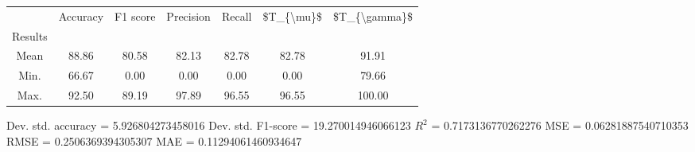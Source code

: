 \begin{tabular}{|c|c|c|c|c|c|c|}
\toprule
{} &  Accuracy &  F1 score &  Precision &  Recall &  \$T\_\{\textbackslash mu\}\$ &  \$T\_\{\textbackslash gamma\}\$ \\
Results &           &           &            &         &            &               \\
\hline
Mean    &     88.86 &     80.58 &      82.13 &   82.78 &      82.78 &         91.91 \\
Min.    &     66.67 &      0.00 &       0.00 &    0.00 &       0.00 &         79.66 \\
Max.    &     92.50 &     89.19 &      97.89 &   96.55 &      96.55 &        100.00 \\
\bottomrule
\end{tabular}

 Dev. std. accuracy = 5.926804273458016
 Dev. std. F1-score = 19.270014946066123
 $R^2$ = 0.7173136770262276
 MSE = 0.06281887540710353
 RMSE = 0.2506369394305307
 MAE = 0.11294061460934647